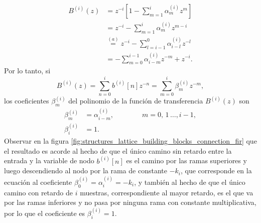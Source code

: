 \documentclass[a4paper]{report}
\begin{document}
\begin{align*}
 B^{(i)}(z)&=z^{-i}\left[1-\sum_{m=1}^i\alpha^{(i)}_mz^{m}\right]\\
  &=z^{-i}-\sum_{m=1}^{i}\alpha^{(i)}_mz^{m-i}\\
  &\overset{(a)}{=}z^{-i}-\sum_{l=i-1}^{0}\alpha^{(i)}_{i-l}z^{-l}\\
  &=-\sum_{m=0}^{i-1}\alpha^{(i)}_{i-m}z^{-m}+z^{-i}.
\end{align*}
Por lo tanto, si
\[
 B^{(i)}(z)=\sum_{n=0}^ib^{(i)}[n]z^{-n}=\sum_{m=0}^i\beta^{(i)}_mz^{-m},
\]
los coeficientes \(\beta^{(i)}_m\) del polinomio de la función de transferencia \(B^{(i)}(z)\) son
\begin{align*}
 \beta^{(i)}_m&=\alpha^{(i)}_{i-m},\qquad\qquad m=0,\,1\,\dots,i-1,\\
 \beta^{(i)}_i&=1.
\end{align*}
Observar en la figura \ref{fig:structures_lattice_building_blocks_connection_fir} que el resultado es acorde al hecho de que el único camino sin retardo entre la entrada y la variable de nodo \(b^{(i)}[n]\) es el camino por las ramas superiores y luego descendiendo al nodo por la rama de constante \(-k_i\), que corresponde en la ecuación al coeficiente \(\beta^{(i)}_0=\alpha^{(i)}_{i}=-k_i\), y también al hecho de que el único camino con retardo de \(i\) muestras, correspondiente al mayor retardo, es el que va por las ramas inferiores y no pasa por ninguna rama con constante multiplicativa, por lo que el coeficiente es \(\beta^{(i)}_i=1\).
\end{document}

